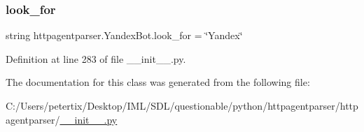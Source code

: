 \hypertarget{classhttpagentparser_1_1_yandex_bot_a1d486debe6eb8bf089fafbb594598449}{}\label{classhttpagentparser_1_1_yandex_bot_a1d486debe6eb8bf089fafbb594598449} 
\subsubsection{\texorpdfstring{look\+\_\+for}{look\_for}}
{\footnotesize\ttfamily string httpagentparser.\+Yandex\+Bot.\+look\+\_\+for = \char`\"{}Yandex\char`\"{}\hspace{0.3cm}{\ttfamily [static]}}



Definition at line 283 of file \+\_\+\+\_\+init\+\_\+\+\_\+.\+py.



The documentation for this class was generated from the following file\+:\begin{DoxyCompactItemize}
\item 
C\+:/\+Users/petertix/\+Desktop/\+I\+M\+L/\+S\+D\+L/questionable/python/httpagentparser/httpagentparser/\hyperlink{____init_____8py}{\+\_\+\+\_\+init\+\_\+\+\_\+.\+py}\end{DoxyCompactItemize}

